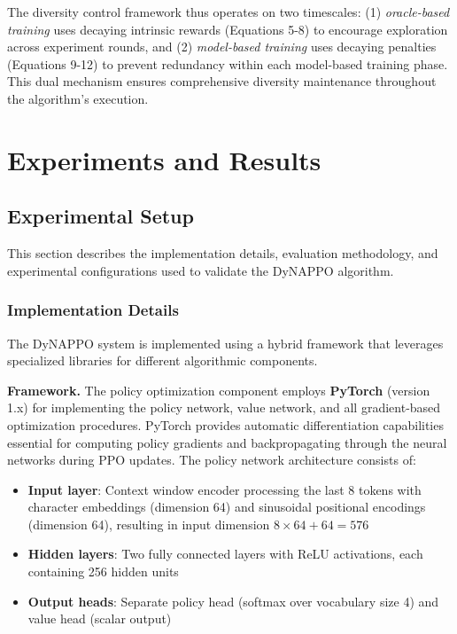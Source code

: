 \documentclass[conference]{IEEEtran}
\begin{document}
The diversity control framework thus operates on two timescales: (1) \emph{oracle-based training} uses decaying intrinsic rewards (Equations 5-8) to encourage exploration across experiment rounds, and (2) \emph{model-based training} uses decaying penalties (Equations 9-12) to prevent redundancy within each model-based training phase. This dual mechanism ensures comprehensive diversity maintenance throughout the algorithm's execution.











\section{Experiments and Results}
\subsection{Experimental Setup}

This section describes the implementation details, evaluation methodology, and experimental configurations used to validate the DyNAPPO algorithm.

\subsubsection{Implementation Details}

The DyNAPPO system is implemented using a hybrid framework that leverages specialized libraries for different algorithmic components.

\textbf{Framework.} The policy optimization component employs \textbf{PyTorch} (version 1.x) for implementing the policy network, value network, and all gradient-based optimization procedures. PyTorch provides automatic differentiation capabilities essential for computing policy gradients and backpropagating through the neural networks during PPO updates. The policy network architecture consists of:
\begin{itemize}
    \item \textbf{Input layer}: Context window encoder processing the last 8 tokens with character embeddings (dimension 64) and sinusoidal positional encodings (dimension 64), resulting in input dimension $8 \times 64 + 64 = 576$
    \item \textbf{Hidden layers}: Two fully connected layers with ReLU activations, each containing 256 hidden units
    \item \textbf{Output heads}: Separate policy head (softmax over vocabulary size 4) and value head (scalar output)
\end{itemize}
\end{document}
